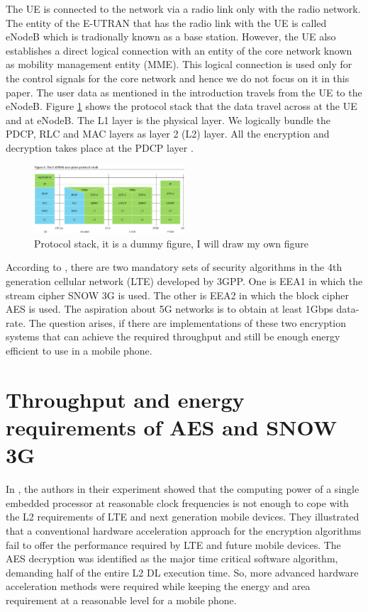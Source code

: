 The UE is connected to the network via a radio link only with the radio network. The entity of the E-UTRAN that has the radio link with the UE is called eNodeB which is tradionally known as a base station. However, the UE also establishes a direct logical connection with an entity of the core network known as mobility management entity (MME). This logical connection is used only for the control signals for the core network and hence we do not focus on it in this paper. The user data as mentioned in the introduction travels from the UE to the eNodeB. Figure \ref{fig:protocl_stack} shows the protocol stack that the data travel across at the UE and at eNodeB. The L1 layer is the physical layer. We logically bundle the PDCP, RLC and MAC layers as layer 2 (L2) layer. All the encryption and decryption takes place at the PDCP layer \cite{3GPP_TS_36_323}.

\begin{figure}
  \includegraphics[width=0.50\textwidth]{protocl_stack.png}
\caption{Protocol stack, it is a dummy figure, I will draw my own figure}
\label{fig:protocl_stack}       %
\end{figure}

According to \cite{3GPP_TS_33_401}, there are two mandatory sets of security algorithms in the 4th generation cellular network (LTE) developed by 3GPP. One is EEA1 in which the stream cipher SNOW 3G is used. The other is EEA2 in which the block cipher AES is used. The aspiration about 5G networks is to obtain at least 1Gbps data-rate. The question arises, if there are implementations of these two encryption systems that can achieve the required throughput and still be enough energy efficient to use in a mobile phone.

\section{Throughput and energy requirements of AES and SNOW 3G}
\label{sec:throughput_and_energy_requirements_of_aes_snow3g}
In \cite{IIS_Ruhr_2009}, the authors in their experiment showed that the computing power of a single embedded processor at reasonable clock frequencies is not enough to cope with the L2 requirements of LTE and next generation mobile devices. They illustrated that a conventional hardware acceleration approach for the encryption algorithms fail to offer the performance required by LTE and future mobile devices. The AES decryption was identified as the major time critical software algorithm, demanding half of the entire L2 DL execution time. So, more advanced hardware acceleration methods were required while keeping the energy and area requirement at a reasonable level for a mobile phone.

